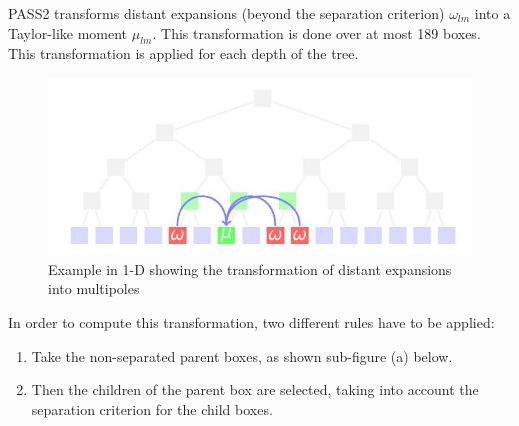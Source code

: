 \documentclass[12pt,twoside,a4paper]{report}
\begin{document}
   PASS2 transforms distant expansions (beyond the separation criterion) $\omega_{lm}$ into a Taylor-like moment $\mu_{lm}$. This transformation is done over at most 189 boxes. This transformation is applied for each depth of the tree.  
   	
   	
 \begin{figure}[H]
 	\label{fig:M2L}
   \includegraphics[scale=0.8]{transformExpansions1}
    \centering 
    \caption{Example in 1-D showing the transformation of distant expansions into multipoles}
    
   \end{figure}
   
	In order to compute this transformation, two different rules have to be applied:
	
	\begin{enumerate}	
	\item Take the non-separated parent boxes, as shown sub-figure (a) below.
	\item Then the children of the parent box are selected, taking into account the separation criterion for the child boxes.	
	\end{enumerate}	   
   
\end{document}
